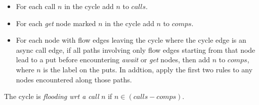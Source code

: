 \documentclass[12pt]{article}%
\begin{document}
\begin{itemize}
\item For each call $n$ in the cycle add $n$ to $calls$.
\item For each \emph{get} node  marked   $n$ in the cycle add   $n$ to  $comps$.
\item For each node with flow edges leaving the cycle where the cycle edge is an async call edge, 
if all paths involving only flow edges starting from that node lead to a put
before encountering \emph{await} or \emph{get} nodes, then add ${n}$ to $comps$,
where ${n}$ is the label on the puts. %
In addtion, apply the first two rules to any nodes encountered along those paths.
\end{itemize}
The cycle is \emph{flooding wrt a call} $n$ if 
$n\in (calls -comps)$.
\end{document}
